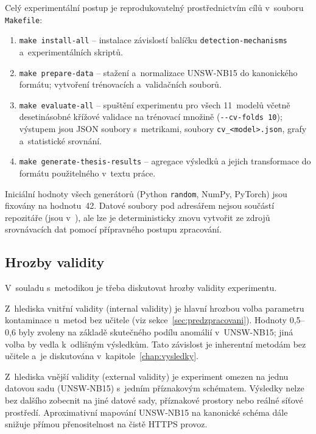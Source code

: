 Celý experimentální postup je reprodukovatelný prostřednictvím cílů v~souboru \texttt{Makefile}:

\begin{enumerate}
\item \texttt{make install-all} -- instalace závislostí balíčku \texttt{detection-mechanisms} a~experimentálních skriptů.
\item \texttt{make prepare-data} -- stažení a~normalizace UNSW-NB15 do kanonického formátu; vytvoření trénovacích a~validačních souborů.
\item \texttt{make evaluate-all} -- spuštění experimentu pro všech 11~modelů včetně desetinásobné křížové validace na trénovací množině (\texttt{-{}-cv-folds 10}); výstupem jsou JSON soubory s~metrikami, soubory \texttt{cv\_<model>.json}, grafy a~statistické srovnání.
\item \texttt{make generate-thesis-results} -- agregace výsledků a jejich transformace do formátu použitelného v~textu práce.
\end{enumerate}

Iniciální hodnoty všech generátorů (Python \texttt{random}, NumPy, PyTorch) jsou fixovány na hodnotu~42. Datové soubory pod adresářem  nejsou součástí repozitáře (jsou v~), ale lze je deterministicky znovu vytvořit ze zdrojů srovnávacích dat pomocí přípravného postupu zpracování.

\subsection{Hrozby validity}
\label{sec:hrozby-validity}

V~souladu s~metodikou \textcite{Wohlin2012} je třeba diskutovat hrozby validity experimentu.

Z~hlediska vnitřní validity (internal validity) je hlavní hrozbou volba parametru kontaminace u~metod bez učitele (viz sekce~\ref{sec:predzpracovani}). Hodnoty 0{,}5--0{,}6 byly zvoleny na základě skutečného podílu anomálií v~UNSW-NB15; jiná volba by vedla k~odlišným výsledkům. Tato závislost je inherentní metodám bez učitele a~je diskutována v~kapitole~\ref{chap:vysledky}.

Z~hlediska vnější validity (external validity) je experiment omezen na jednu datovou sadu (UNSW-NB15) s~jedním příznakovým schématem. Výsledky nelze bez dalšího zobecnit na jiné datové sady, příznakové prostory nebo reálné síťové prostředí. Aproximativní mapování UNSW-NB15 na kanonické schéma dále snižuje přímou přenositelnost na čistě HTTPS provoz.

